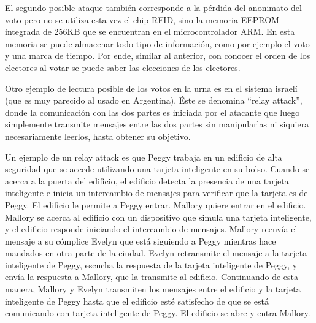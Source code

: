 El segundo posible ataque también corresponde a la pérdida del anonimato del voto pero no se utiliza esta vez el chip RFID, sino la memoria EEPROM integrada de 256KB que se encuentran en el microcontrolador ARM. En esta memoria se puede almacenar todo tipo de información, como por ejemplo el voto y una marca de tiempo. Por ende, similar al anterior, con conocer el orden de los electores al votar se puede saber las elecciones de los electores.

Otro ejemplo de lectura posible de los votos en la urna es en el sistema israelí (que es muy parecido al usado en Argentina). Éste se denomina ``relay attack''\cite{oren:2010}\cite{oren:2012}, donde la comunicación con las dos partes es iniciada por el atacante que luego simplemente transmite mensajes entre las dos partes sin manipularlas ni siquiera necesariamente leerlos, hasta obtener su objetivo.

Un ejemplo de un relay attack es que Peggy trabaja en un edificio de alta seguridad que se accede utilizando una tarjeta inteligente en su bolso. Cuando se acerca a la puerta del edificio, el edificio detecta la presencia de una tarjeta inteligente e inicia un intercambio de mensajes para verificar que la tarjeta es de Peggy. El edificio le permite a Peggy entrar. Mallory quiere entrar en el edificio. Mallory se acerca al edificio con un dispositivo que simula una tarjeta inteligente, y el edificio responde iniciando el intercambio de mensajes. Mallory reenvía el mensaje a su cómplice Evelyn que está siguiendo a Peggy mientras hace mandados en otra parte de la ciudad. Evelyn retransmite el mensaje a la tarjeta inteligente de Peggy, escucha la respuesta de la tarjeta inteligente de Peggy, y envía la respuesta a Mallory, que la transmite al edificio. Continuando de esta manera, Mallory y Evelyn transmiten los mensajes entre el edificio y la tarjeta inteligente de Peggy hasta que el edificio esté satisfecho de que se está comunicando con tarjeta inteligente de Peggy. El edificio se abre y entra Mallory.\cite{wiki:relay}

